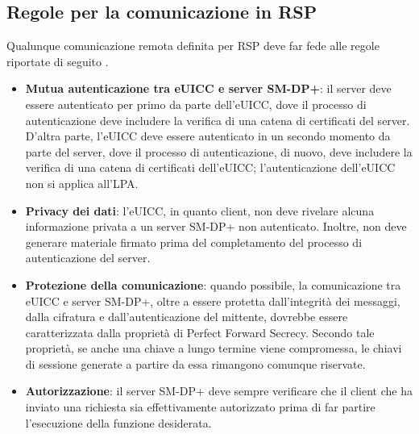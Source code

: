 \documentclass[10pt, oneside]{book}
\begin{document}
\subsection{Regole per la comunicazione in RSP}
Qualunque comunicazione remota definita per RSP deve far fede alle regole riportate di seguito \cite{GSMA-docs-new}.
\begin{itemize}
\item \textbf{Mutua autenticazione tra eUICC e server SM-DP+}: il server deve essere autenticato per primo da parte dell'eUICC, dove il processo di autenticazione deve includere la verifica di una catena di certificati del server. D'altra parte, l'eUICC deve essere autenticato in un secondo momento da parte del server, dove il processo di autenticazione, di nuovo, deve includere la verifica di una catena di certificati dell'eUICC; l'autenticazione dell'eUICC non si applica all'LPA.
\item \textbf{Privacy dei dati}: l'eUICC, in quanto client, non deve rivelare alcuna informazione privata a un server SM-DP+ non autenticato. Inoltre, non deve generare materiale firmato prima del completamento del processo di autenticazione del server.
\item \textbf{Protezione della comunicazione}: quando possibile, la comunicazione tra eUICC e server SM-DP+, oltre a essere protetta dall'integrità dei messaggi, dalla cifratura e dall'autenticazione del mittente, dovrebbe essere caratterizzata dalla proprietà di Perfect Forward Secrecy. Secondo tale proprietà, se anche una chiave a lungo termine viene compromessa, le chiavi di sessione generate a partire da essa rimangono comunque riservate.
\item \textbf{Autorizzazione}: il server SM-DP+ deve sempre verificare che il client che ha inviato una richiesta sia effettivamente autorizzato prima di far partire l'esecuzione della funzione desiderata.
\end{itemize}
\end{document}
